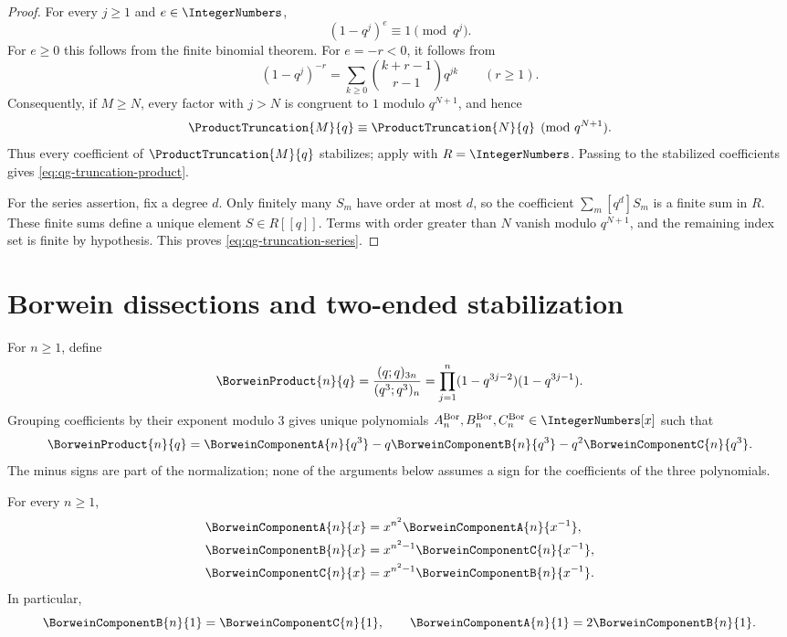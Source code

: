 \begin{proof}
For every \(j\ge1\) and \(e\in\IntegerNumbers\),
\[
 (1-q^j)^e\equiv1\pmod{q^j}.
\]
For \(e\ge0\) this follows from the finite binomial theorem.  For
\(e=-r<0\), it follows from
\[
 (1-q^j)^{-r}
 =\sum_{k\ge0}\binom{k+r-1}{r-1}q^{jk}
 \qquad(r\ge1).
\]
Consequently, if \(M\ge N\), every factor with \(j>N\) is congruent to \(1\)
modulo \(q^{N+1}\), and hence
\[
 \ProductTruncation{M}{q}\equiv\ProductTruncation{N}{q}
 \pmod{q^{N+1}}.
\]
Thus every coefficient of \(\ProductTruncation{M}{q}\) stabilizes; apply
 with \(R=\IntegerNumbers\).  Passing to
the stabilized coefficients gives \eqref{eq:qg-truncation-product}.

For the series assertion, fix a degree \(d\).  Only finitely many \(S_m\)
have order at most \(d\), so the coefficient
\(\sum_m[q^d]S_m\) is a finite sum in \(R\).  These finite sums define a
unique element \(S\in R[[q]]\).  Terms with order greater than \(N\) vanish
modulo \(q^{N+1}\), and the remaining index set is finite by hypothesis.
This proves \eqref{eq:qg-truncation-series}.
\end{proof}

\section{Borwein dissections and two-ended stabilization}

For \(n\ge1\), define
\begin{equation}
 \BorweinProduct{n}{q}=\frac{(q;q)_{3n}}{(q^3;q^3)_n}
 =\prod_{j=1}^{n}(1-q^{3j-2})(1-q^{3j-1}).
\label{eq:qg-borwein-product}
\end{equation}
Grouping coefficients by their exponent modulo \(3\) gives unique
polynomials
\(A_n^{\mathrm{Bor}},B_n^{\mathrm{Bor}},C_n^{\mathrm{Bor}}
\in\IntegerNumbers[x]\) such that
\begin{equation}
 \BorweinProduct{n}{q}
 =\BorweinComponentA{n}{q^3}
  -q\BorweinComponentB{n}{q^3}
  -q^2\BorweinComponentC{n}{q^3}.
\label{eq:qg-borwein-dissection}
\end{equation}
The minus signs are part of the normalization; none of the arguments below
assumes a sign for the coefficients of the three polynomials.

\begin{proposition}
\label{qg:prop-borwein-reciprocity}
For every \(n\ge1\),
\begin{align}
 \BorweinComponentA{n}{x}
 &=x^{n^2}\BorweinComponentA{n}{x^{-1}},\\
 \BorweinComponentB{n}{x}
 &=x^{n^2-1}\BorweinComponentC{n}{x^{-1}},\\
 \BorweinComponentC{n}{x}
 &=x^{n^2-1}\BorweinComponentB{n}{x^{-1}}.
\label{eq:qg-borwein-reciprocity}
\end{align}
In particular,
\[
 \BorweinComponentB{n}{1}=\BorweinComponentC{n}{1},
 \qquad
 \BorweinComponentA{n}{1}=2\BorweinComponentB{n}{1}.
\]
\end{proposition}

